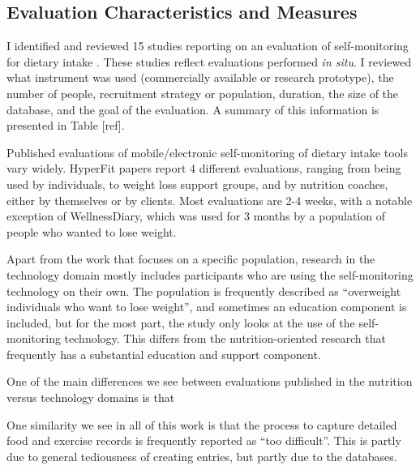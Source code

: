 \subsection{Evaluation Characteristics and Measures}
I identified and reviewed 15 studies reporting on an evaluation of self-monitoring for dietary intake \citep{glanz_improving_2006, burke_effect_2011,fukuo_development_2009,atienza_using_2008, yon_personal_2007, acharya_using_2011, arsand_usability_2007,jarvinen_hyperfit:_2008, mattila_mobile_2008, kozakai_dietary_2006, reddy_image_2007, silva_sapofitness:_2011, tsai_usability_2007, wang_development_2006, long_effectiveness_2012}. These studies reflect evaluations performed \textit{in situ}. I reviewed what instrument was used (commercially available or research prototype), the number of people, recruitment strategy or population, duration, the size of the database, and the goal of the evaluation. A summary of this information is presented in Table [ref].  



Published evaluations of mobile/electronic self-monitoring of dietary intake tools vary widely. HyperFit papers report 4 different evaluations, ranging from being used by individuals, to weight loss support groups, and by nutrition coaches, either by themselves or by clients. Most evaluations are 2-4 weeks, with a notable exception of WellnessDiary, which was used for 3 months by a population of people who wanted to lose weight. 

Apart from the work that focuses on a specific population, research in the technology domain mostly includes participants who are using the self-monitoring technology on their own. The population is frequently described as ``overweight individuals who want to lose weight'', and sometimes an education component is included, but for the most part, the study only looks at the use of the self-monitoring technology. This differs from the nutrition-oriented research that frequently has a substantial education and support component. 

One of the main differences we see between evaluations published in the nutrition versus technology domains is that 

One similarity we see in all of this work is that the process to capture detailed food and exercise records is frequently reported as ``too difficult''. This is partly due to general tediousness of creating entries, but partly due to the databases. 

